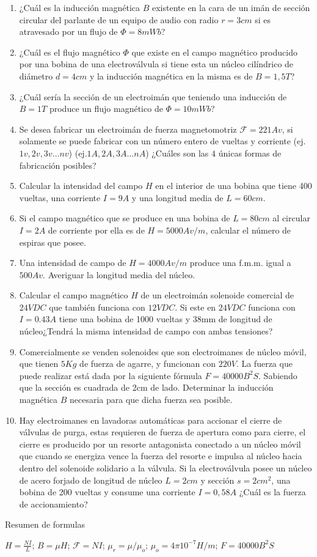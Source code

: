 \documentclass[../main]{subfiles}
\begin{document}
\begin{enumerate}
  \item ¿Cuál es la inducción magnética $B$ existente en la cara de
    un imán de sección circular del parlante de un equipo de audio
    con radio $r=3cm$ si es atravesado por un flujo de $\Phi = 8mWb$?
  \item ¿Cuál es el flujo magnético $\Phi$ que existe en el campo
    magnético producido por una bobina de una electroválvula si tiene
    esta un núcleo cilíndrico de diámetro $d=4cm$ y la inducción
    magnética en la misma es de $B=1,5T$?
  \item ¿Cuál sería la sección de un electroimán que teniendo una
    inducción de $B=1T$ produce un flujo magnético de $\Phi=10mWb$?
  \item Se desea fabricar un electroimán de fuerza magnetomotriz
    $\mathcal{F}=221Av$, si solamente se puede fabricar con un número
    entero de vueltas y corriente (ej.$1v,2v,3v \ldots nv$) (ej.$1A,
    2A, 3A\ldots nA$) ¿Cuáles son las $4$ únicas formas de fabricación posibles?
  \item Calcular la intensidad del campo $H$ en el interior de una
    bobina que tiene 400 vueltas, una corriente $I=9A$ y una longitud
    media de $L=60cm$.
  \item Si el campo magnético que se produce en una bobina de
    $L=80cm$ al circular $I=2A$ de corriente por ella es de
    $H=5000Av/m$, calcular el número de espiras que posee.
  \item Una intensidad de campo de $H=4000Av/m$ produce una f.m.m.
    igual a $500Av$. Averiguar la longitud media del núcleo.
  \item Calcular el campo magnético $H$ de un electroimán solenoide
    comercial de $24VDC$ que también funciona con $12VDC$. Si este en
    $24VDC$ funciona con $I=0.43A$ tiene una bobina de 1000 vueltas y
    38mm de longitud de núcleo¿Tendrá la misma intensidad de campo
    con ambas tensiones?
  \item Comercialmente se venden solenoides que son electroimanes de
    núcleo móvil, que tienen $5Kg$ de fuerza de agarre, y funcionan
    con $220V$. La fuerza que puede realizar está dada por la
    siguiente fórmula $ F = 40000 B^2 S$. Sabiendo que la sección es
    cuadrada de 2cm de lado. Determinar la inducción magnética $B$
    necesaria para que dicha fuerza sea posible.
  \item Hay electroimanes en lavadoras automáticas para accionar el
    cierre de válvulas de purga, estas requieren de fuerza de
    apertura como para cierre, el cierre es producido por un resorte
    antagonista conectado a un núcleo móvil que cuando se energiza
    vence la fuerza del resorte e impulsa al núcleo hacia dentro del
    solenoide solidario a la válvula. Si la electroválvula posee un
    núcleo de acero forjado de longitud de núcleo $L=2cm$ y sección
    $s=2cm^2$, una bobina de 200 vueltas y consume una corriente
    $I=0,58A$ ¿Cuál es la fuerza de accionamiento?
\end{enumerate}

Resumen de formulas

$ H=\frac{NI}{L}$; $ B=\mu H$; $\mathcal{F}=NI$;
$\mu_r=\mu/\mu_o$; $\mu_o= 4\pi10^{-7}H/m$; $ F = 40000 B^2 S$
\end{document}
